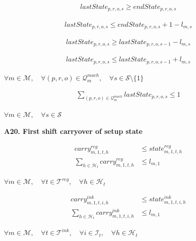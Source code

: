 \documentclass{article}
\begin{document}
\begin{align}
lastState_{p,r,o,s}
\ge
endState_{p,r,o,s}
\label{eq:A19_endState_drives_lastState}
\end{align}


\begin{align}
lastState_{p,r,o,s}
\le
endState_{p,r,o,s}
+
1-l_{m,s}
\label{eq:A19_if_active_lastState_match_endState}
\end{align}

\begin{align}
lastState_{p,r,o,s}
\ge
lastState_{p,r,o,s-1}
-
l_{m,s}
\label{eq:A19_propagate_inactive_up}
\end{align}

\begin{align}
lastState_{p,r,o,s}
\le
lastState_{p,r,o,s-1}
+
l_{m,s}
\label{eq:A19_propagate_inactive_down}
\end{align}

\begin{center}
$\forall m \in \mathcal{M}, \quad
\forall (p,r,o) \in \mathcal{Q}^{mach}_{m}, \quad
\forall s \in \mathcal{S}\setminus\{1\}$
\end{center}

\begin{align}
\sum_{(p,r,o)\in \mathcal{Q}^{mach}_{m}}
lastState_{p,r,o,s}
\le
1
\label{eq:A19_lastState_pro_machine}
\end{align}
\begin{center}
$\forall m \in \mathcal{M}, \quad
\forall s \in \mathcal{S}$
\end{center}


\noindent\textbf{A20. First shift carryover of setup state}

\begin{align}
carry^{reg}_{m,1,t,h}
&\le
state^{reg}_{m,1,t,h}
\label{eq:A20_reg_first_shift_carry_current_state}
\\
\sum_{h\in\mathcal{H}_t}
carry^{reg}_{m,1,t,h}
&\le
l_{m,1}
\label{eq:A20_reg_first_shift_carry_limit}
\end{align}
\begin{center}
$\forall m \in \mathcal{M}, \quad
\forall t \in \mathcal{T}^{reg}, \quad
\forall h \in \mathcal{H}_t$
\end{center}

\begin{align}
carry^{ink}_{m,1,t,i,h}
&\le
state^{ink}_{m,1,t,i,h}
\label{eq:A20_ink_first_shift_carry_current_state}
\\
\sum_{h\in\mathcal{H}_t}
carry^{ink}_{m,1,t,i,h}
&\le
l_{m,1}
\label{eq:A20_ink_first_shift_carry_limit}
\end{align}
\begin{center}
$\forall m \in \mathcal{M}, \quad
\forall t \in \mathcal{T}^{ink}, \quad
\forall i \in \mathcal{I}_t, \quad
\forall h \in \mathcal{H}_t$
\end{center}
\end{document}
